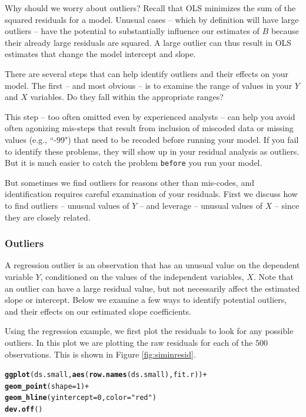 \documentclass[11pt,openany]{book}
\makeatletter
\newcommand{\hlnum}[1]{\textcolor[rgb]{0.686,0.059,0.569}{#1}}%
\newcommand{\hlstr}[1]{\textcolor[rgb]{0.192,0.494,0.8}{#1}}%
\newcommand{\hlopt}[1]{\textcolor[rgb]{0,0,0}{#1}}%
\newcommand{\hlstd}[1]{\textcolor[rgb]{0.345,0.345,0.345}{#1}}%
\newcommand{\hlkwc}[1]{\textcolor[rgb]{0.333,0.667,0.333}{#1}}%
\newcommand{\hlkwd}[1]{\textcolor[rgb]{0.737,0.353,0.396}{\textbf{#1}}}%
\newenvironment{kframe}{%
 \def\at@end@of@kframe{}%
 \ifinner\ifhmode%
  \def\at@end@of@kframe{\end{minipage}}%
  \begin{minipage}{\columnwidth}%
 \fi\fi%
 \def\FrameCommand##1{\hskip\@totalleftmargin \hskip-\fboxsep
 \colorbox{shadecolor}{##1}\hskip-\fboxsep
     \hskip-\linewidth \hskip-\@totalleftmargin \hskip\columnwidth}%
 \MakeFramed {\advance\hsize-\width
   \@totalleftmargin\z@ \linewidth\hsize
   \@setminipage}}%
 {\par\unskip\endMakeFramed%
 \at@end@of@kframe}
\newenvironment{knitrout}{}{} %
\renewenvironment{knitrout}{\begin{singlespace}}{\end{singlespace}}
\makeatother
\begin{document}
Why should we worry about outliers? Recall that OLS minimizes the sum of the squared residuals for a model. Unusual cases -- which by definition will have large outliers -- have the potential to substantially influence our estimates of $B$ because their already large residuals are squared. A large outlier can thus result in OLS estimates that change the model intercept and slope.

There are several steps that can help identify outliers and their effects on your model. The first -- and most obvious -- is to examine the range of values in your $Y$ and $X$ variables. Do they fall within the appropriate ranges?

This step -- too often omitted even by experienced analysts -- can help you avoid often agonizing mis-steps that result from inclusion of miscoded data or missing values (e.g., ``-99") that need to be recoded before running your model. If you fail to identify these problems, they will show up in your residual analysis as outliers. But it is much easier to catch the problem \texttt{before} you run your model.

But sometimes we find outliers for reasons other than mis-codes, and identification requires careful examination of your residuals.  First we discuss how to find outliers -- unusual values of $Y$ -- and leverage -- unusual values of $X$ -- since they are closely related.  

\subsubsection{Outliers}

A regression outlier is an observation that has an unusual value on the dependent variable $Y$, conditioned on the values of the independent variables, $X$. Note that an outlier can have a large residual value, but not necessarily affect the estimated slope or intercept. Below we examine a few ways to identify potential outliers, and their effects on our estimated slope coefficients.   

Using the regression example, we first plot the residuals to look for any possible outliers. In this plot we are plotting the raw residuals for each of the $500$ observations. This is shown in Figure \ref{fig:siminresid}.  

\begin{knitrout}
\color{fgcolor}\begin{kframe}
\begin{alltt}
\hlkwd{ggplot}\hlstd{(ds.small,} \hlkwd{aes}\hlstd{(}\hlkwd{row.names}\hlstd{(ds.small), fit.r))} \hlopt{+}
  \hlkwd{geom_point}\hlstd{(}\hlkwc{shape} \hlstd{=} \hlnum{1}\hlstd{)} \hlopt{+}
  \hlkwd{geom_hline}\hlstd{(}\hlkwc{yintercept} \hlstd{=} \hlnum{0}\hlstd{,} \hlkwc{color} \hlstd{=} \hlstr{"red"}\hlstd{)}
\hlkwd{dev.off}\hlstd{()}
\end{alltt}
\end{kframe}
\end{knitrout}
\end{document}
